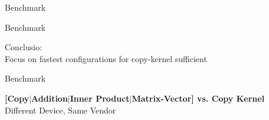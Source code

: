\begin{frame}{Benchmark}
\end{frame}

\begin{frame}{Benchmark}
  \begin{center} Conclusio: \\[1em] {\Large Focus on fastest configurations for copy-kernel sufficient}  \end{center}
\end{frame}





\begin{frame}{Benchmark}
  \begin{center} \textbf{ [Copy$|$Addition$|$Inner Product$|$Matrix-Vector] vs. Copy Kernel }\\[1em] Different Device, Same Vendor \end{center}
\end{frame}

